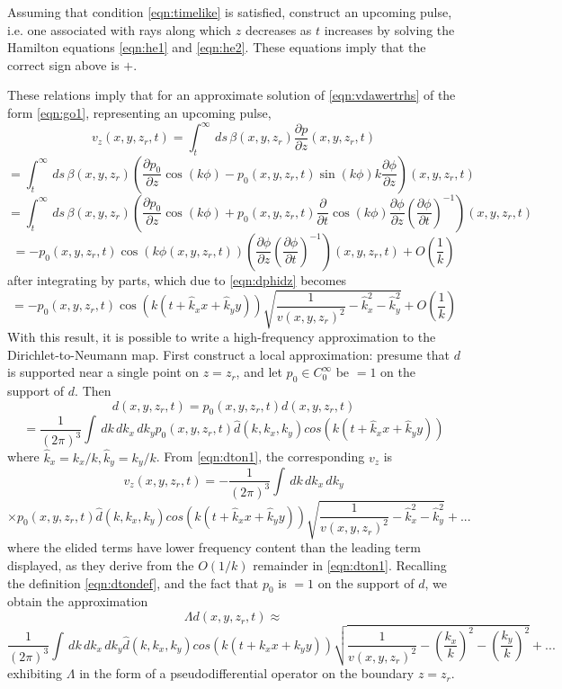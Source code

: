 Assuming that condition \ref{eqn:timelike} is satisfied, construct an upcoming pulse, i.e. one associated with rays along which $z$ decreases as $t$ increases by solving the Hamilton equations \ref{eqn:he1} and \ref{eqn:he2}. These equations imply that the correct sign above is $+$.  

These relations imply that for an approximate solution of \ref{eqn:vdawertrhs} of the form \ref{eqn:go1}, representing an upcoming pulse,
\[
v_z(x,y,z_r,t) = \int_t^{\infty}\,ds\,\beta(x,y,z_r)\frac{\partial p}{\partial z}(x,y,z_r,t)
\]
\[
=\int_t^{\infty}\,ds\,\beta(x,y,z_r)\left(\frac{\partial p_0}{\partial z} \cos(k\phi) - p_0(x,y,z_r,t)\sin(k\phi)k\frac{\partial \phi}{\partial z}\right) (x,y,z_r,t)
\]
\[
=\int_t^{\infty}\,ds\,\beta(x,y,z_r)\left(\frac{\partial p_0}{\partial z} \cos(k\phi) + p_0(x,y,z_r,t)\frac{\partial}{\partial t}\cos(k\phi)\frac{\partial \phi}{\partial z}\left(\frac{\partial \phi}{\partial t}\right)^{-1}\right) (x,y,z_r,t)
\]
\[
=-p_0(x,y,z_r,t)\cos(k\phi(x,y,z_r,t)) \left(\frac{\partial \phi}{\partial z}\left(\frac{\partial \phi}{\partial t}\right)^{-1} \right)(x,y,z_r,t)+ O\left(\frac{1}{k}\right)
\]
after integrating by parts, which due to \ref{eqn:dphidz} becomes
\begin{equation}
\label{eqn:dton1}
=-p_0(x,y,z_r,t)\cos(k(t+\hat{k}_x x + \hat{k}_y y)) \sqrt{\frac{1}{v(x,y,z_r)^2}-\hat{k}_x^2-\hat{k}_y^2} + O\left(\frac{1}{k}\right)
\end{equation}
With this result, it is possible to write a high-frequency approximation to the Dirichlet-to-Neumann map. First construct a local approximation: presume that $d$ is supported near a single point on $z=z_r$, and let $p_0 \in C^{\infty}_0$ be $=1$ on the support of $d$. Then 
\[
d(x,y,z_r,t) = p_0(x,y,z_r,t)d(x,y,z_r,t) 
\]
\[
= \frac{1}{(2\pi)^3} \int\,dk\,dk_{x}\,dk_y p_0(x,y,z_r,t)\hat{d}(k,k_{x},k_{y})cos(k(t+\hat{k}_x x +\hat{k}_y y))
\]
where $\hat{k}_x=k_x/k,\hat{k}_y=k_y/k$. From \ref{eqn:dton1}, the corresponding $v_z$ is 
\[
v_z(x,y,z_r,t) = -\frac{1}{(2\pi)^3} \int\,dk\,dk_{x}\,dk_y
\]
\[
\times  p_0(x,y,z_r,t)\hat{d}(k,k_{x},k_{y})cos(k(t+\hat{k}_x x +\hat{k}_y y)) \sqrt{\frac{1}{v(x,y,z_r)^2}-\hat{k}_x^2-\hat{k}_y^2} +...
\]
where the elided terms have lower frequency content than the leading term displayed, as they derive from the $O(1/k)$ remainder in \ref{eqn:dton1}. Recalling the definition \ref{eqn:dtondef}, and the fact that $p_0$ is $=1$ on the support of $d$, we obtain the approximation
\[
\Lambda d (x,y,z_r,t) \approx 
\]
\begin{equation}
\label{eqn:dtonpseudo}
\frac{1}{(2\pi)^3} \int\,dk\,dk_{x}\,dk_y \hat{d}(k,k_{x},k_{y})cos(k(t+k_x x +k_y y)) \sqrt{\frac{1}{v(x,y,z_r)^2}-\left(\frac{k_x}{k}\right)^2-\left(\frac{k_y}{k}\right)^2} +...
\end{equation}
exhibiting $\Lambda$ in the form of a pseudodifferential operator on the boundary $z=z_r$.

